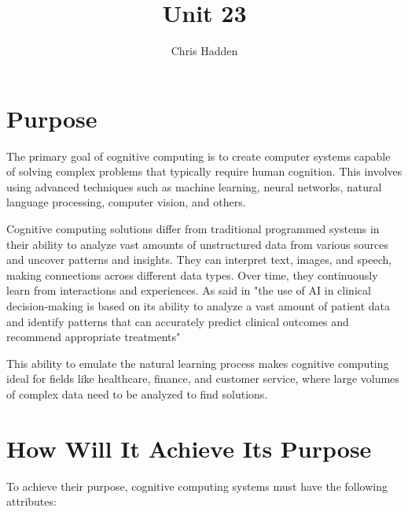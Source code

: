 \documentclass{article}
\title{Unit 23}
\author{Chris Hadden}
\date{}
\begin{document}
\maketitle

\section{Purpose}
The primary goal of cognitive computing is to create computer systems capable of solving complex problems that typically require human cognition. This involves using advanced techniques such as machine learning, neural networks, natural language processing, computer vision, and others.

Cognitive computing solutions differ from traditional programmed systems in their ability to analyze vast amounts of unstructured data from various sources and uncover patterns and insights. They can interpret text, images, and speech, making connections across different data types. Over time, they continuously learn from interactions and experiences. As said in \cite{transform} "the use of AI in clinical decision-making is based on its ability to analyze a vast amount of patient data and identify patterns that can accurately predict clinical outcomes and recommend appropriate treatments"

This ability to emulate the natural learning process makes cognitive computing ideal for fields like healthcare, finance, and customer service, where large volumes of complex data need to be analyzed to find solutions.

\section{How Will It Achieve Its Purpose}
To achieve their purpose, cognitive computing systems must have the following attributes:
\end{document}
